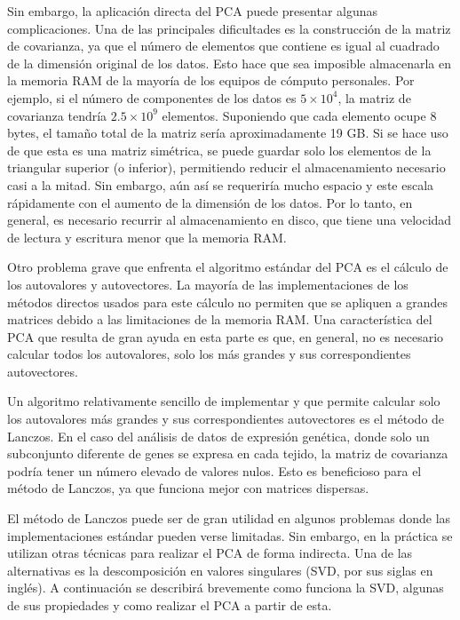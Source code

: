 Sin embargo, la aplicación directa del PCA puede presentar algunas complicaciones. Una de las principales dificultades es la construcción de la matriz de covarianza, ya que el número de elementos que contiene es igual al cuadrado de la dimensión original de los datos. Esto hace que sea imposible almacenarla en la memoria RAM de la mayoría de los equipos de cómputo personales. Por ejemplo, si el número de componentes de los datos es $5 \times 10^4$, la matriz de covarianza tendría $2.5 \times 10^9$ elementos. Suponiendo que cada elemento ocupe 8 bytes, el tamaño total de la matriz sería aproximadamente 19 GB. Si se hace uso de que esta es una matriz simétrica, se puede guardar solo los elementos de la triangular superior (o inferior), permitiendo reducir el almacenamiento necesario casi a la mitad. Sin embargo, aún así se requeriría mucho espacio y este escala rápidamente con el aumento de la dimensión de los datos. Por lo tanto, en general, es necesario recurrir al almacenamiento en disco, que tiene una velocidad de lectura y escritura menor que la memoria RAM.

Otro problema grave que enfrenta el algoritmo estándar del PCA es el cálculo de los autovalores y autovectores. La mayoría de las implementaciones de los métodos directos usados para este cálculo no permiten que se apliquen a grandes matrices debido a las limitaciones de la memoria RAM. Una característica del PCA que resulta de gran ayuda en esta parte es que, en general, no es necesario calcular todos los autovalores, solo los más grandes y sus correspondientes autovectores.

Un algoritmo relativamente sencillo de implementar y que permite calcular solo los autovalores más grandes y  sus correspondientes autovectores es el método de Lanczos. En el caso del análisis de datos de expresión genética, donde solo un subconjunto diferente de genes se expresa en cada tejido, la matriz de covarianza podría tener un número elevado de valores nulos. Esto es beneficioso para el método de Lanczos, ya que funciona mejor con matrices dispersas.

El método de Lanczos puede ser de gran utilidad en algunos problemas donde las implementaciones estándar pueden verse limitadas. Sin embargo, en la práctica se utilizan otras técnicas para realizar el PCA de forma indirecta. Una de las alternativas es la descomposición en valores singulares (SVD, por sus siglas en inglés). %
A continuación se describirá brevemente como funciona la SVD, algunas de sus propiedades y como realizar el PCA a partir de esta.

